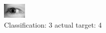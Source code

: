 \begin{figure}[h!]
\begin{center}
\includegraphics[width=0.60\columnwidth]{figures/ID3173_class_3_target_4.png}
\end{center}
\caption{ Classification: 3 actual target: 4}
\label{fig:ID3173_class_3_target_4}
\end{figure}
